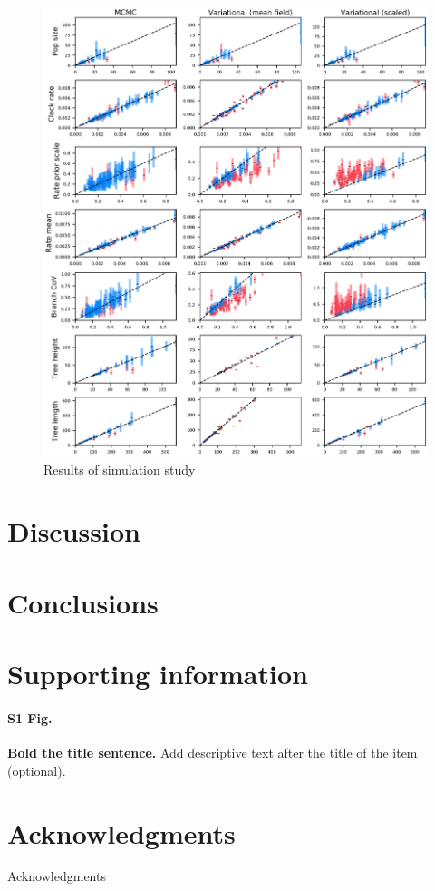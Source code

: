 \documentclass{article}
\begin{document}
\begin{figure}
    \centering
    \includegraphics[width=\linewidth]{manuscript/figures/coverage}
    \caption{Results of simulation study}
    \label{fig:coverage}
\end{figure}

\section*{Discussion}

\section*{Conclusions}

\section*{Supporting information}

\paragraph*{S1 Fig.}
\label{S1_Fig}
{\bf Bold the title sentence.} Add descriptive text after the title of the item (optional).

\section*{Acknowledgments}
Acknowledgments



\end{document}
